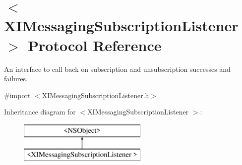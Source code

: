 \hypertarget{protocol_x_i_messaging_subscription_listener_01-p}{}\section{$<$X\+I\+Messaging\+Subscription\+Listener $>$ Protocol Reference}
\label{protocol_x_i_messaging_subscription_listener_01-p}


An interface to call back on subscription and unsubscription successes and failures.  




{\ttfamily \#import $<$X\+I\+Messaging\+Subscription\+Listener.\+h$>$}

Inheritance diagram for $<$X\+I\+Messaging\+Subscription\+Listener $>$\+:\begin{figure}[H]
\begin{center}
\leavevmode
\includegraphics[height=2.000000cm]{protocol_x_i_messaging_subscription_listener_01-p}
\end{center}
\end{figure}
